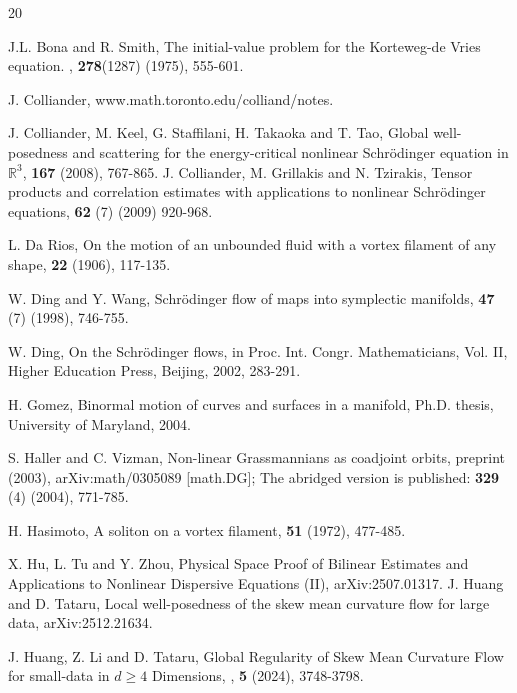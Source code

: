 \documentclass[11pt,letterpaper,reqno]{amsart}
\numberwithin{equation}{section}
\theoremstyle{definition}
\theoremstyle{remark}
\begin{document}
\begin{thebibliography}{20}

   J.L. Bona and R. Smith,  The initial-value problem for the Korteweg-de Vries equation.  , \textbf{278}(1287) (1975), 555-601.
	
	J. Colliander, www.math.toronto.edu/colliand/notes.
	
	J. Colliander, M. Keel, G. Staffilani, H. Takaoka and T. Tao, Global well-posedness
	and scattering for the energy-critical nonlinear Schr\"{o}dinger equation in $\mathbb{R}^3$,  \textbf{167} (2008), 767-865.
	J. Colliander, M. Grillakis and N. Tzirakis, Tensor products and correlation estimates
	with applications to nonlinear Schr\"{o}dinger equations, 
	\textbf{62} (7) (2009) 920-968.
	
	
 L.	Da Rios, On the motion of an unbounded fluid with a
	vortex filament of any shape, 
	\textbf{22} (1906), 117-135.
	
	
	W. Ding and Y. Wang, Schr\"odinger flow of maps into symplectic manifolds,  \textbf{47} (7) (1998), 746-755.
	
	W. Ding, On the Schr\"odinger flows, in Proc. Int. Congr. Mathematicians, Vol. II,
	Higher Education Press, Beijing, 2002,  283-291.
	
	H. Gomez, Binormal motion of curves and surfaces in a manifold, Ph.D. thesis, University of Maryland, 2004.
	
	S. Haller and C. Vizman, Non-linear Grassmannians as coadjoint orbits, preprint
	(2003), arXiv:math/0305089 [math.DG]; The abridged version is published:  \textbf{329} (4) (2004), 771-785.
	
	
	
	H. Hasimoto, A soliton on a vortex filament,  \textbf{51} (1972), 477-485.

	X. Hu, L. Tu and Y. Zhou, Physical Space Proof of Bilinear Estimates and Applications to Nonlinear Dispersive Equations (II), arXiv:2507.01317.
J. Huang and D. Tataru,
Local well-posedness of the skew mean curvature flow for large data, arXiv:2512.21634.
	
	J. Huang, Z. Li and D. Tataru, Global Regularity of Skew Mean Curvature Flow for small-data in $d\ge 4$ Dimensions,
, \textbf{5} (2024),  3748-3798.
	

\end{thebibliography}
\end{document}
